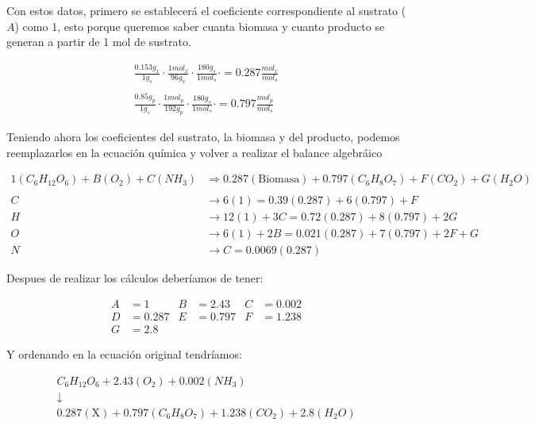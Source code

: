 Con estos datos, primero se establecerá el coeficiente correspondiente al sustrato ($A$) como 1, esto porque queremos saber cuanta biomasa y cuanto producto se generan a partir de 1 mol de sustrato.

\begin{gather*}
    \frac{0.153g_{x}}{1g_{s}} \cdot \frac{1mol_{x}}{96g_{x}} \cdot \frac{180g_{s}}{1mol_{s}} \cdot = 0.287\frac{mol_{x}}{mol_{s}}
    \\
    \\
    \frac{0.85g_{p}}{1g_{s}} \cdot \frac{1mol_{p}}{192g_{p}} \cdot \frac{180g_{s}}{1mol_{s}} \cdot = 0.797\frac{mol_{p}}{mol_{s}}
\end{gather*}

Teniendo ahora los coeficientes del sustrato, la biomasa y del producto, podemos reemplazarlos en la ecuación química y volver a realizar el balance algebráico

\begin{align*}
    1(C_{6}H_{12}O_{6}) + B(O_{2}) + C(NH_{3}) &\Longrightarrow 0.287(\text{Biomasa}) + 0.797(C_{6}H_{8}O_{7}) + F(CO_{2}) + G(H_{2}O)
    \\
    \\
    C &\longrightarrow 6(1) = 0.39(0.287) + 6(0.797) + F
    \\
    H &\longrightarrow 12(1) + 3C = 0.72(0.287) + 8(0.797) + 2G
    \\
    O &\longrightarrow 6(1) + 2B = 0.021(0.287) + 7(0.797) + 2F + G
    \\
    N &\longrightarrow C = 0.0069(0.287)
\end{align*}

Despues de realizar los cálculos deberíamos de tener:

\begin{align*}
    A&=1     & B&=2.43  & C&=0.002
    \\
    D&=0.287 & E&=0.797 & F&=1.238
    \\
    G&=2.8
\end{align*}

Y ordenando en la ecuación original tendríamos:

\begin{gather*}
    C_{6}H_{12}O_{6} + 2.43(O_{2}) + 0.002(NH_{3})
    \\
    \downarrow
    \\
    0.287(\text{X}) + 0.797(C_{6}H_{8}O_{7}) + 1.238(CO_{2}) + 2.8(H_{2}O)
\end{gather*}